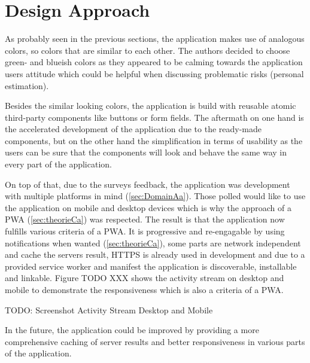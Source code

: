 
\section{Design Approach}
\label{sec:implementationDesign}

As probably seen in the previous sections, the application makes use of analogous colors, so colors that are similar to each other. The authors decided to choose green- and blueish colors as they appeared to be calming towards the application users attitude which could be helpful when discussing problematic risks (personal estimation).

Besides the similar looking colors, the application is build with reusable atomic third-party components like buttons or form fields. The aftermath on one hand is the accelerated development of the application due to the ready-made components, but on the other hand the simplification in terms of usability as the users can be sure that the components will look and behave the same way in every part of the application.

On top of that, due to the surveys feedback, the application was development with multiple platforms in mind (\ref{sec:DomainAa}). Those polled would like to use the application on mobile and desktop devices which is why the approach of a PWA (\ref{sec:theorieCa}) was respected. The result is that the application now fulfills various criteria of a PWA. It is progressive and re-engagable by using notifications when wanted (\ref{sec:theorieCa}), some parts are network independent and cache the servers result, HTTPS is already used in development and due to a provided service worker and manifest the application is discoverable, installable and linkable. Figure TODO XXX shows the activity stream on desktop and mobile to demonstrate the responsiveness which is also a criteria of a PWA.

TODO: Screenshot Activity Stream Desktop and Mobile

In the future, the application could be improved by providing a more comprehensive caching of server results and better responsiveness in various parts of the application.
